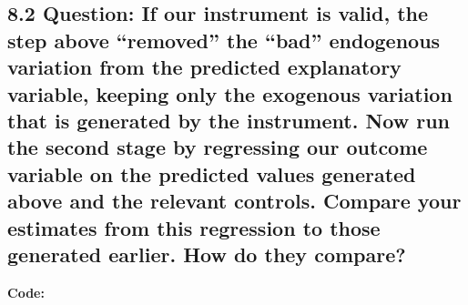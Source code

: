 \documentclass[
]{article}
\newenvironment{Shaded}{\begin{snugshade}}{\end{snugshade}}
\newcommand{\AttributeTok}[1]{\textcolor[rgb]{0.13,0.29,0.53}{#1}}
\newcommand{\ConstantTok}[1]{\textcolor[rgb]{0.56,0.35,0.01}{#1}}
\newcommand{\FunctionTok}[1]{\textcolor[rgb]{0.13,0.29,0.53}{\textbf{#1}}}
\newcommand{\NormalTok}[1]{#1}
\newcommand{\OtherTok}[1]{\textcolor[rgb]{0.56,0.35,0.01}{#1}}
\newcommand{\SpecialCharTok}[1]{\textcolor[rgb]{0.81,0.36,0.00}{\textbf{#1}}}
\newcommand{\StringTok}[1]{\textcolor[rgb]{0.31,0.60,0.02}{#1}}
\begin{document}
\hypertarget{question-if-our-instrument-is-valid-the-step-above-removed-the-bad-endogenous-variation-from-the-predicted-explanatory-variable-keeping-only-the-exogenous-variation-that-is-generated-by-the-instrument.-now-run-the-second-stage-by-regressing-our-outcome-variable-on-the-predicted-values-generated-above-and-the-relevant-controls.-compare-your-estimates-from-this-regression-to-those-generated-earlier.-how-do-they-compare}{%
\subsection{8.2 Question: If our instrument is valid, the step above
``removed'' the ``bad'' endogenous variation from the predicted
explanatory variable, keeping only the exogenous variation that is
generated by the instrument. Now run the second stage by regressing our
outcome variable on the predicted values generated above and the
relevant controls. Compare your estimates from this regression to those
generated earlier. How do they
compare?}\label{question-if-our-instrument-is-valid-the-step-above-removed-the-bad-endogenous-variation-from-the-predicted-explanatory-variable-keeping-only-the-exogenous-variation-that-is-generated-by-the-instrument.-now-run-the-second-stage-by-regressing-our-outcome-variable-on-the-predicted-values-generated-above-and-the-relevant-controls.-compare-your-estimates-from-this-regression-to-those-generated-earlier.-how-do-they-compare}}

\textbf{Code:}

\begin{Shaded}
\end{Shaded}
\end{document}
